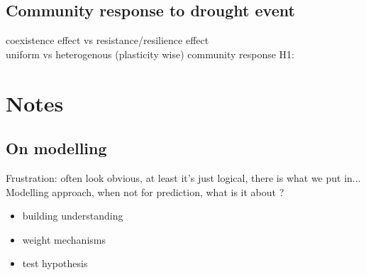 \documentclass[english,10pt]{article}
\begin{document}
\subsection{Community response to drought event}
coexistence effect vs resistance/resilience effect\\
uniform vs heterogenous (plasticity wise) community response
H1: 


\section{Notes}

\subsection{On modelling}
Frustration: often look obvious, at least it's just logical, there is what we put in...\\

Modelling approach, when not for prediction, what is it about ?
\begin{itemize}
\item building understanding
\item weight mechanisms
\item test hypothesis
\end{itemize}

 \nocite{TitlesOn}
 
 


  
\end{document}
